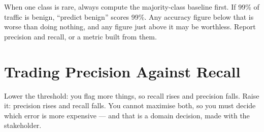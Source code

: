 \begin{alertbox}
When one class is rare, always compute the majority-class baseline first. If 99\%
of traffic is benign, ``predict benign'' scores 99\%. Any accuracy figure below
that is worse than doing nothing, and any figure just above it may be worthless.
Report precision and recall, or a metric built from them.
\end{alertbox}

\section{Trading Precision Against Recall}

\begin{conceptbox}
Lower the threshold: you flag more things, so recall rises and precision falls.
Raise it: precision rises and recall falls. You cannot maximise both, so you must
decide which error is more expensive --- and that is a domain decision, made with
the stakeholder.
\end{conceptbox}

